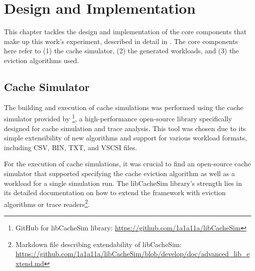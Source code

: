 \chapter{Design and Implementation}\label{chapter:design}

This chapter tackles the design and implementation of the core components that make up this work's experiment, described in detail in . The core components here refer to (1) the cache simulator, (2) the generated workloads, and (3) the eviction algorithms used.



\section{Cache Simulator}\label{sec: cache-simulations}


The building and execution of cache simulations was performed using the cache simulator provided by \footnote{GitHub for libCacheSim library: \url{https://github.com/1a1a11a/libCacheSim}}, a high-performance open-source library specifically designed for cache simulation and trace analysis. This tool was chosen due to its simple extensibility of new algorithms and support for various workload formats, including CSV, BIN, TXT, and VSCSI files.

For the execution of cache simulations, it was crucial to find an open-source cache simulator that supported specifying the cache eviction algorithm as well as a workload for a single simulation run. The libCacheSim library's strength lies in its detailed documentation on how to extend the framework with eviction algorithms or trace readers\footnote{Markdown file describing extendability of libCacheSim: \url{https://github.com/1a1a11a/libCacheSim/blob/develop/doc/advanced_lib_extend.md}}.




